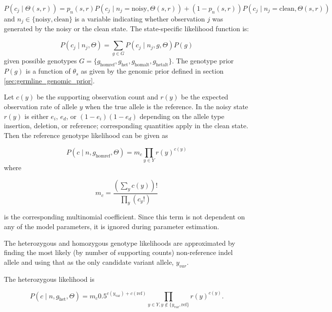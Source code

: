 \documentclass{article}
\begin{document}
\begin{equation*}
P(c_j \mid \Theta(s,r)) = p_n(s,r) P(c_j \mid n_j=\text{noisy}, \Theta(s,r)) + (1-p_n(s,r)) P(c_j \mid n_j=\text{clean}, \Theta(s,r))
\end{equation*}
and $n_j \in \{ \text{noisy}, \text{clean} \}$ is a variable indicating whether observation $j$ was generated by the noisy or the clean state. The state-specific likelihood function is:

\begin{equation*}
P(c_j \mid n_j, \Theta)=\sum_{g\in G}P(c_j \mid n_j, g, \Theta)P(g)
\end{equation*}
given possible genotypes $G=\{ g_{\text{homref}}, g_{\text{het}}, g_{\text{homalt}}, g_{\text{hetalt}} \}$. The genotype prior $P(g)$ is a function of $\theta_s$ as given by the genomic prior defined in section \ref{sec:germline_genomic_prior}.

Let $c(y)$ be the supporting observation count and $r(y)$ be the expected observation rate of allele $y$ when the true allele is the reference. In the noisy state $r(y)$ is either $e_i$, $e_d$, or $(1-e_i)(1-e_d)$ depending on the allele type insertion, deletion, or reference; corresponding quantities apply in the clean state. Then the reference genotype likelihood can be given as

\begin{equation*}
P(c \mid n, g_{\text{homref}}, \Theta)=m_c \prod_{y \in Y}r(y)^{c(y)}
\end{equation*}
where

\begin{equation*}
m_c = \frac{(\sum_{y}{c(y)})!}{\prod_{y}{(c_y!)}}
\end{equation*}

is the corresponding multinomial coefficient. Since this term is not dependent on any of the model parameters, it is ignored during parameter estimation.

The heterozygous and homozygous genotype likelihoods are approximated by finding the most likely (by number of supporting counts) non-reference indel allele and using that as the only candidate variant allele, $y_{var}$.

The heterozygous likelihood is

\begin{equation*}
P (c \mid n, g_{\text{het}}, \Theta) = m_c 0.5^{c(y_{\text{var}}) + c(\text{ref})} \prod_{y \in Y, y \not\in \{y_{\text{var}},\text{ref}\}} r(y)^{c(y)}.
\end{equation*}
\end{document}

